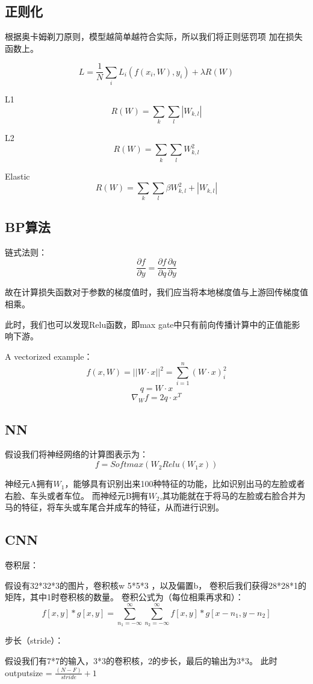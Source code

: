 \documentclass[a4paper]{article}
\begin{document}
\subsection{正则化}

根据奥卡姆剃刀原则，模型越简单越符合实际，所以我们将正则惩罚项
加在损失函数上。

$$L =\frac{1}{N} \sum_i L_i(f(x_i,W),y_i)+λ R(W)$$

L1
$$R(W)=\sum_k \sum_l |W_{k,l}|$$

L2
$$R(W)=\sum_k \sum_l W_{k,l}^2$$

Elastic
$$R(W)=\sum_k \sum_l \beta W_{k,l}^2+|W_{k,l}|$$
\subsection{BP算法}
链式法则：
$$\frac{\partial f}{\partial y}=\frac{\partial f}{\partial q}\frac{\partial q}{\partial y}$$

故在计算损失函数对于参数的梯度值时，我们应当将本地梯度值与上游回传梯度值相乘。

此时，我们也可以发现Relu函数，即max gate中只有前向传播计算中的正值能影响下游。

A vectorized example：
$$f(x,W) =||W ⋅ x||^2 = \sum_{i=1}^n(W ⋅ x)_i^2$$
$$q = W \cdot x$$
$$\nabla_W f = 2q \cdot x^T$$


\subsection{NN}
假设我们将神经网络的计算图表示为：
$$f = Softmax(W_2 Relu(W_1 x))$$

神经元A拥有$W_1$，能够具有识别出来100种特征的功能，比如识别出马的左脸或者右脸、车头或者车位。
而神经元B拥有$W_2$,其功能就在于将马的左脸或右脸合并为马的特征，将车头或车尾合并成车的特征，从而进行识别。

\subsection{CNN}

卷积层：

假设有32*32*3的图片，卷积核w 5*5*3 ，以及偏置b，
卷积后我们获得28*28*1的矩阵，其中1时卷积核的数量。
卷积公式为（每位相乘再求和）：
$$
f[x,y] * g[x,y] = \sum_{n_1=-\infty}^{\infty } \sum_{n_2=-\infty}^{\infty } f[x,y] * g[x-n_1,y-n_2]
$$

步长（stride）：

假设我们有7*7的输入，3*3的卷积核，2的步长，最后的输出为3*3。
此时outputsize = $\frac{(N-F)}{stride}+1$
\end{document}
